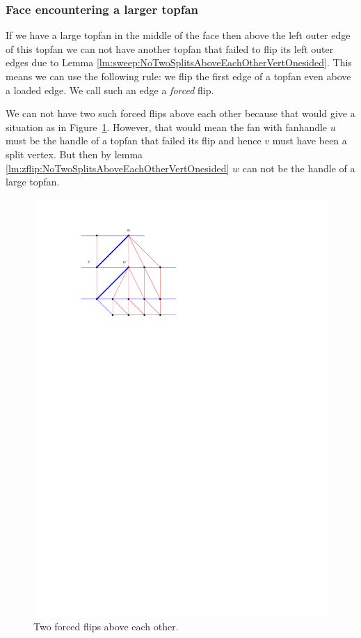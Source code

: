 \subsubsection{Face encountering a larger topfan}
  If we have a large topfan in the middle of the face then above the left outer edge of this topfan we can not have another topfan that failed to flip its left outer edges due to Lemma \ref{lm:sweep:NoTwoSplitsAboveEachOtherVertOnesided}.
  This means we can use the following rule: we flip the first edge of a topfan even above a loaded edge.
  We call such an edge a \emph{forced} flip.

  We can not have two such forced flips above each other because that would give a situation as in Figure~\ref{fig:subdiv:forcedFlips}.
  However, that would mean the fan with fanhandle $u$ must be the handle of a topfan that failed its flip and hence $v$ must have been a split vertex. But then by lemma \ref{lm:zflip:NoTwoSplitsAboveEachOtherVertOnesided} $w$ can not be the handle of a large topfan.

  \begin{figure}[t]
    \centering
    \includegraphics[scale=1]{blueFaceSubdivision/img/forcedFlips.pdf}
    \caption{Two forced flips above each other.}
    \label{fig:subdiv:forcedFlips}
  \end{figure}

